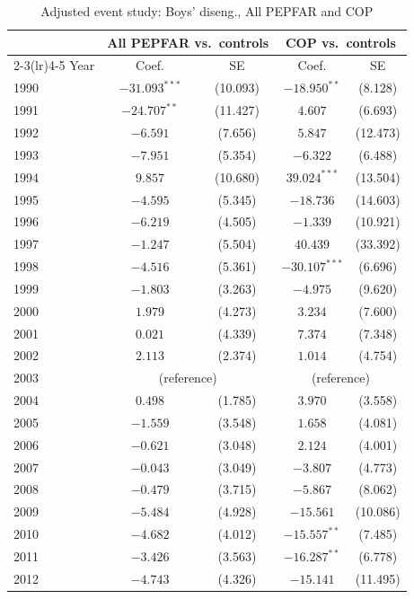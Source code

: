 \begin{table}[htbp]
\centering
\small
\caption{Adjusted event study: Boys' diseng., All PEPFAR and COP}
\label{tab:es_combined_prim_disengage_boys}
\begin{tabular}{lcccc}
\toprule
 & \multicolumn{2}{c}{All PEPFAR vs.\ controls} & \multicolumn{2}{c}{COP vs.\ controls} \\
\cmidrule(lr){2-3}\cmidrule(lr){4-5}
Year & Coef. & SE & Coef. & SE \\
\midrule
1990 & $-31.093^{***}$ & (10.093) & $-18.950^{**}$ & (8.128) \\
1991 & $-24.707^{**}$ & (11.427) & $4.607$ & (6.693) \\
1992 & $-6.591$ & (7.656) & $5.847$ & (12.473) \\
1993 & $-7.951$ & (5.354) & $-6.322$ & (6.488) \\
1994 & $9.857$ & (10.680) & $39.024^{***}$ & (13.504) \\
1995 & $-4.595$ & (5.345) & $-18.736$ & (14.603) \\
1996 & $-6.219$ & (4.505) & $-1.339$ & (10.921) \\
1997 & $-1.247$ & (5.504) & $40.439$ & (33.392) \\
1998 & $-4.516$ & (5.361) & $-30.107^{***}$ & (6.696) \\
1999 & $-1.803$ & (3.263) & $-4.975$ & (9.620) \\
2000 & $1.979$ & (4.273) & $3.234$ & (7.600) \\
2001 & $0.021$ & (4.339) & $7.374$ & (7.348) \\
2002 & $2.113$ & (2.374) & $1.014$ & (4.754) \\
2003 & \multicolumn{2}{c}{(reference)} & \multicolumn{2}{c}{(reference)} \\
2004 & $0.498$ & (1.785) & $3.970$ & (3.558) \\
2005 & $-1.559$ & (3.548) & $1.658$ & (4.081) \\
2006 & $-0.621$ & (3.048) & $2.124$ & (4.001) \\
2007 & $-0.043$ & (3.049) & $-3.807$ & (4.773) \\
2008 & $-0.479$ & (3.715) & $-5.867$ & (8.062) \\
2009 & $-5.484$ & (4.928) & $-15.561$ & (10.086) \\
2010 & $-4.682$ & (4.012) & $-15.557^{**}$ & (7.485) \\
2011 & $-3.426$ & (3.563) & $-16.287^{**}$ & (6.778) \\
2012 & $-4.743$ & (4.326) & $-15.141$ & (11.495) \\

\end{tabular}
\end{table}
